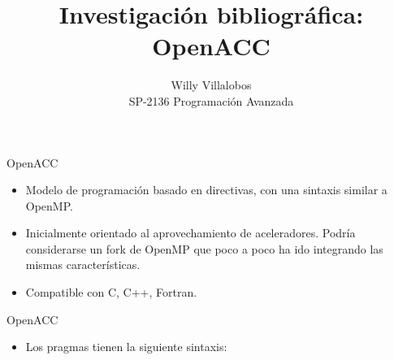 \documentclass[aspectratio=169]{beamer}
\begin{document}
\title{Investigación bibliográfica: OpenACC}
\author{Willy Villalobos\\SP-2136 Programación Avanzada}


\begin{frame}
    \titlepage

\end{frame}



\begin{frame}{OpenACC}
    \begin{itemize}
        \item Modelo de programación basado en directivas, con una sintaxis similar a OpenMP.
        \item Inicialmente orientado al aprovechamiento de aceleradores. Podría considerarse un fork de OpenMP que poco a poco ha ido integrando las mismas características.
        \item Compatible con C, C++, Fortran.
    \end{itemize}
\end{frame}

\begin{frame}{OpenACC}
    \begin{itemize}
        \item Los pragmas tienen la siguiente sintaxis:
    \end{itemize}

    \begin{figure}
        \centering
    \end{figure}
\end{frame}
\end{document}
